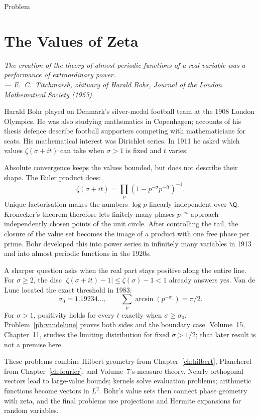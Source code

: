 \begin{exname}Problem\end{exname}
\renewcommand{\ocExName}{Problem}
\chapter{The Values of Zeta}\label{ch:harder}

\begin{center}\itshape
The creation of the theory of almost periodic functions of a real variable was a performance of extraordinary power.\\
\upshape --- E.~C.~Titchmarsh, obituary of Harald Bohr, \emph{Journal of the London Mathematical Society} (1953)
\end{center}
Harald Bohr played on Denmark's silver-medal football team at the 1908 London Olympics. He was also studying mathematics in Copenhagen; accounts of his thesis defence describe football supporters competing with mathematicians for seats. His mathematical interest was Dirichlet series. In 1911 he asked which values $\zeta(\sigma+it)$ can take when $\sigma>1$ is fixed and $t$ varies.

Absolute convergence keeps the values bounded, but does not describe their shape. The Euler product does:
\[\zeta(\sigma+it)=\prod_p(1-p^{-\sigma}p^{-it})^{-1}.\]
Unique factorisation makes the numbers $\log p$ linearly independent over $\Q$. Kronecker's theorem therefore lets finitely many phases $p^{-it}$ approach independently chosen points of the unit circle. After controlling the tail, the closure of the value set becomes the image of a product with one free phase per prime. Bohr developed this into power series in infinitely many variables in 1913 and into almost periodic functions in the 1920s.

A sharper question asks when the real part stays positive along the entire line. For $\sigma\ge2$, the disc $|\zeta(\sigma+it)-1|\le\zeta(\sigma)-1<1$ already answers yes. Van de Lune located the exact threshold in 1983:
\[\sigma_0=1.19234\ldots,\qquad\sum_p\arcsin(p^{-\sigma_0})=\pi/2.
\]
For $\sigma>1$, positivity holds for every $t$ exactly when $\sigma\ge\sigma_0$. Problem~\ref{pb:vandelune} proves both sides and the boundary case. Volume~15, Chapter~11, studies the limiting distribution for fixed $\sigma>1/2$; that later result is not a premise here.

These problems combine Hilbert geometry from Chapter~\ref{ch:hilbert}, Plancherel from Chapter~\ref{ch:fourier}, and Volume~7's measure theory. Nearly orthogonal vectors lead to large-value bounds; kernels solve evaluation problems; arithmetic functions become vectors in $L^2$. Bohr's value sets then connect phase geometry with zeta, and the final problems use projections and Hermite expansions for random variables.

